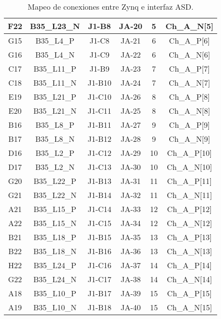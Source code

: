 \begin{table}[]
{\begin{tabular}{|c|c|c|c|c|c|}
				F22 & B35\_L23\_N & J1-B8  & JA-20 & 5  & Ch\_A\_N{[}5{]}  \\ \hline
				\rowcolor[HTML]{D9E1F2} 
				G15 & B35\_L4\_P  & J1-C8  & JA-21 & 6  & Ch\_A\_P{[}6{]}  \\ \hline
				G16 & B35\_L4\_N  & J1-C9  & JA-22 & 6  & Ch\_A\_N{[}6{]}  \\ \hline
				\rowcolor[HTML]{D9E1F2} 
				C17 & B35\_L11\_P & J1-B9  & JA-23 & 7  & Ch\_A\_P{[}7{]}  \\ \hline
				C18 & B35\_L11\_N & J1-B10 & JA-24 & 7  & Ch\_A\_N{[}7{]}  \\ \hline
				\rowcolor[HTML]{D9E1F2} 
				E19 & B35\_L21\_P & J1-C10 & JA-26 & 8  & Ch\_A\_P{[}8{]}  \\ \hline
				E20 & B35\_L21\_N & J1-C11 & JA-25 & 8  & Ch\_A\_N{[}8{]}  \\ \hline
				\rowcolor[HTML]{D9E1F2} 
				B16 & B35\_L8\_P  & J1-B11 & JA-27 & 9  & Ch\_A\_P{[}9{]}  \\ \hline
				B17 & B35\_L8\_N  & J1-B12 & JA-28 & 9  & Ch\_A\_N{[}9{]}  \\ \hline
				\rowcolor[HTML]{D9E1F2} 
				D16 & B35\_L2\_P  & J1-C12 & JA-29 & 10 & Ch\_A\_P{[}10{]} \\ \hline
				D17 & B35\_L2\_N  & J1-C13 & JA-30 & 10 & Ch\_A\_N{[}10{]} \\ \hline
				\rowcolor[HTML]{D9E1F2} 
				G20 & B35\_L22\_P & J1-B13 & JA-31 & 11 & Ch\_A\_P{[}11{]} \\ \hline
				G21 & B35\_L22\_N & J1-B14 & JA-32 & 11 & Ch\_A\_N{[}11{]} \\ \hline
				\rowcolor[HTML]{D9E1F2} 
				A21 & B35\_L15\_P & J1-C14 & JA-33 & 12 & Ch\_A\_P{[}12{]} \\ \hline
				A22 & B35\_L15\_N & J1-C15 & JA-34 & 12 & Ch\_A\_N{[}12{]} \\ \hline
				\rowcolor[HTML]{D9E1F2} 
				B21 & B35\_L18\_P & J1-B15 & JA-35 & 13 & Ch\_A\_P{[}13{]} \\ \hline
				B22 & B35\_L18\_N & J1-B16 & JA-36 & 13 & Ch\_A\_N{[}13{]} \\ \hline
				\rowcolor[HTML]{D9E1F2} 
				H22 & B35\_L24\_P & J1-C16 & JA-37 & 14 & Ch\_A\_P{[}14{]} \\ \hline
				G22 & B35\_L24\_N & J1-C17 & JA-38 & 14 & Ch\_A\_N{[}14{]} \\ \hline
				\rowcolor[HTML]{D9E1F2} 
				A18 & B35\_L10\_P & J1-B17 & JA-39 & 15 & Ch\_A\_P{[}15{]} \\ \hline
				A19 & B35\_L10\_N & J1-B18 & JA-40 & 15 & Ch\_A\_N{[}15{]} \\ \hline
			\end{tabular}%
		}
		\caption{Mapeo de conexiones entre Zynq e interfaz ASD. }
		\label{tab:zynq-asd}
	\end{table}
	
